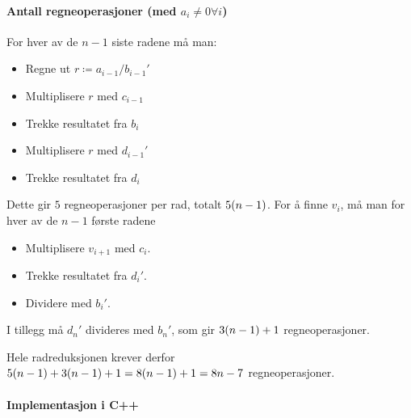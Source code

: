 \documentclass[12pt,norsk,a4paper]{report}
\begin{document}
\paragraph{Antall regneoperasjoner (med \(a_i\neq0\forall i\))}
For hver av de \(n-1\) siste radene må man:
\begin{itemize}
\item Regne ut \(r\coloneqq a_{i-1}/b_{i-1}'\)
\item Multiplisere \(r\) med \(c_{i-1}\)
\item Trekke resultatet fra \(b_i\)
\item Multiplisere \(r\) med \(d_{i-1}'\)
\item Trekke resultatet fra \(d_i\)
\end{itemize}
Dette gir \(5\) regneoperasjoner per rad, totalt \(5\qty(n-1)\). For å finne \(v_i\), må man for hver av de \(n-1\) første radene
\begin{itemize}
\item Multiplisere \(v_{i+1}\) med \(c_i\).
\item Trekke resultatet fra \(d_i'\).
\item Dividere med \(b_i'\).
\end{itemize}
I tillegg må \(d_n'\) divideres med \(b_n'\), som gir \(3\qty(n-1)+1\) regneoperasjoner.

Hele radreduksjonen krever derfor \(5\qty(n-1)+3\qty(n-1)+1=8\qty(n-1)+1=8n-7\) regneoperasjoner.

\paragraph{Implementasjon i C++}
\inputminted{cpp}{generell.cpp}
\end{document}
